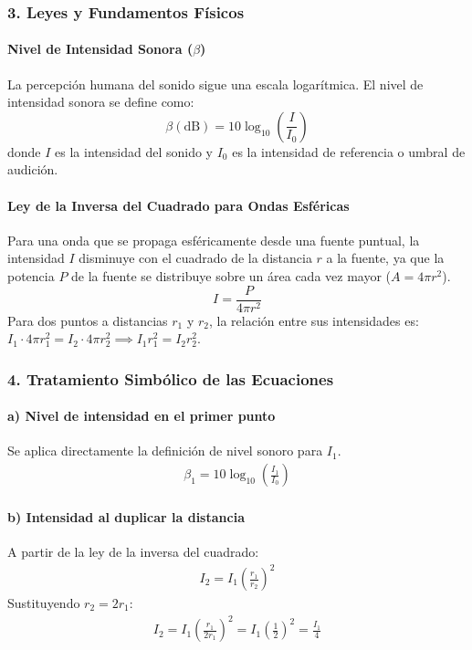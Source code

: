 \subsubsection*{3. Leyes y Fundamentos Físicos}
\paragraph*{Nivel de Intensidad Sonora ($\beta$)}
La percepción humana del sonido sigue una escala logarítmica. El nivel de intensidad sonora se define como:
$$ \beta (\text{dB}) = 10 \log_{10}\left(\frac{I}{I_0}\right) $$
donde $I$ es la intensidad del sonido y $I_0$ es la intensidad de referencia o umbral de audición.

\paragraph*{Ley de la Inversa del Cuadrado para Ondas Esféricas}
Para una onda que se propaga esféricamente desde una fuente puntual, la intensidad $I$ disminuye con el cuadrado de la distancia $r$ a la fuente, ya que la potencia $P$ de la fuente se distribuye sobre un área cada vez mayor ($A=4\pi r^2$).
$$ I = \frac{P}{4\pi r^2} $$
Para dos puntos a distancias $r_1$ y $r_2$, la relación entre sus intensidades es: $I_1 \cdot 4\pi r_1^2 = I_2 \cdot 4\pi r_2^2 \implies I_1 r_1^2 = I_2 r_2^2$.

\subsubsection*{4. Tratamiento Simbólico de las Ecuaciones}
\paragraph*{a) Nivel de intensidad en el primer punto}
Se aplica directamente la definición de nivel sonoro para $I_1$.
\begin{gather}
    \beta_1 = 10 \log_{10}\left(\frac{I_1}{I_0}\right)
\end{gather}
\paragraph*{b) Intensidad al duplicar la distancia}
A partir de la ley de la inversa del cuadrado:
\begin{gather}
    I_2 = I_1 \left(\frac{r_1}{r_2}\right)^2
\end{gather}
Sustituyendo $r_2 = 2r_1$:
\begin{gather}
    I_2 = I_1 \left(\frac{r_1}{2r_1}\right)^2 = I_1 \left(\frac{1}{2}\right)^2 = \frac{I_1}{4}
\end{gather}

